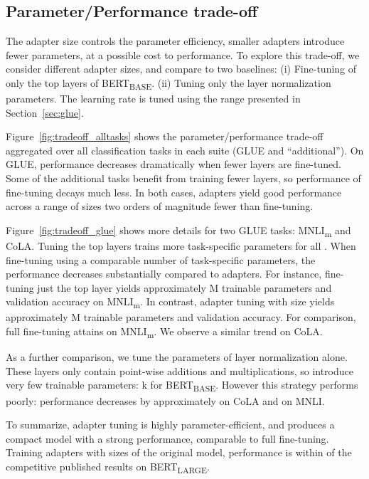 \documentclass{article}
\begin{document}
\subsection{Parameter/Performance trade-off\label{sec:param_efficiency}}

The adapter size controls the parameter efficiency, smaller adapters introduce fewer parameters, at a possible cost to performance.
To explore this trade-off, we consider different adapter sizes, and compare to two baselines:
(i) Fine-tuning of only the top  layers of BERT\textsubscript{BASE}.
(ii) Tuning only the layer normalization parameters.
The learning rate is tuned using the range presented in Section~\ref{sec:glue}.

Figure~\ref{fig:tradeoff_alltasks} shows the parameter/performance trade-off aggregated over all classification tasks in each suite (GLUE and ``additional'').
On GLUE, performance decreases dramatically when fewer layers are fine-tuned.
Some of the additional tasks benefit from training fewer layers, so performance of fine-tuning decays much less.
In both cases, adapters yield good performance across a range of sizes two orders of magnitude fewer than fine-tuning.

Figure~\ref{fig:tradeoff_glue} shows more details for two GLUE tasks: MNLI\textsubscript{m} and CoLA.
Tuning the top layers trains more task-specific parameters for all .
When fine-tuning using a comparable number of task-specific parameters, the performance decreases substantially compared to adapters.
For instance, fine-tuning just the top layer yields approximately M trainable parameters and  validation accuracy on MNLI\textsubscript{m}.
In contrast, adapter tuning with size  yields approximately M trainable parameters and   validation accuracy.
For comparison, full fine-tuning attains  on MNLI\textsubscript{m}.
We observe a similar trend on CoLA.

As a further comparison, we tune the parameters of layer normalization alone.
These layers only contain point-wise additions and multiplications, so introduce very few trainable parameters: k for BERT\textsubscript{BASE}.
However this strategy performs poorly: performance decreases by approximately  on CoLA and  on MNLI.

To summarize, adapter tuning is highly parameter-efficient, and produces a compact model with a strong performance, comparable to full fine-tuning.
Training adapters with sizes  of the original model,
performance is within  of the competitive published results on BERT\textsubscript{LARGE}.
\end{document}
